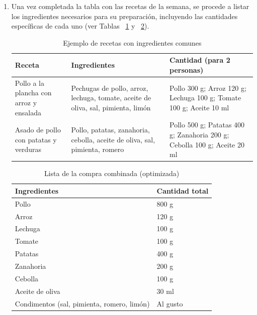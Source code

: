 \documentclass[12pt,a4paper]{report} %
\begin{document}
\begin{enumerate}
		\item Una vez completada la tabla con las recetas de la semana, se procede a listar los ingredientes necesarios para su preparación, incluyendo las cantidades específicas de cada uno (ver Tablas ~\ref{fig:TablaDeIngredientes} y ~\ref{fig:TablaCombinada}).
		
		\begin{table}[H]
			\centering
			\caption{Ejemplo de recetas con ingredientes comunes}
			
			\begin{tabular}{|p{3.5cm}|p{7cm}|p{3cm}|}
				\hline
				\textbf{Receta} & \textbf{Ingredientes} & \textbf{Cantidad (para 2 personas)} \\ \hline
				
				Pollo a la plancha con arroz y ensalada 
				& Pechugas de pollo, arroz, lechuga, tomate, aceite de oliva, sal, pimienta, limón 
				& Pollo 300 g; Arroz 120 g; Lechuga 100 g; Tomate 100 g; Aceite 10 ml \\ \hline
				
				Asado de pollo con patatas y verduras 
				& Pollo, patatas, zanahoria, cebolla, aceite de oliva, sal, pimienta, romero 
				& Pollo 500 g; Patatas 400 g; Zanahoria 200 g; Cebolla 100 g; Aceite 20 ml \\ \hline
			\end{tabular}
			\label{fig:TablaDeIngredientes}
		\end{table}
		
		\begin{table}[H]
			\centering
			\caption{Lista de la compra combinada (optimizada)}

			\begin{tabular}{|p{5cm}|p{3cm}|}
				\hline
				\textbf{Ingredientes} & \textbf{Cantidad total} \\ \hline
				Pollo & 800 g \\ \hline
				Arroz & 120 g \\ \hline
				Lechuga & 100 g \\ \hline
				Tomate & 100 g \\ \hline
				Patatas & 400 g \\ \hline
				Zanahoria & 200 g \\ \hline
				Cebolla & 100 g \\ \hline
				Aceite de oliva & 30 ml \\ \hline
				Condimentos (sal, pimienta, romero, limón) & Al gusto \\ \hline
			\end{tabular}
			\label{fig:TablaCombinada}
		\end{table}
		

\end{enumerate}
\end{document}
